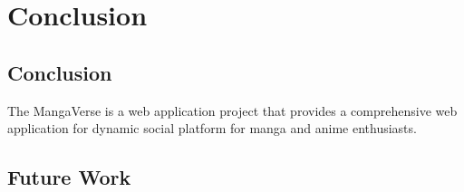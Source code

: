 \chapter{Conclusion}

\section{Conclusion}
The MangaVerse is a web application project that provides a comprehensive web application for 
dynamic social platform for manga and anime enthusiasts.  


\section{Future Work}

